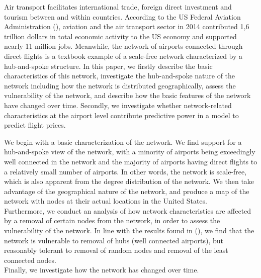\label{sec:intro}




Air transport facilitates international trade, foreign direct investment and tourism between and within countries. According to the US Federal Aviation Administration (\citet{FAA}), aviation and the air transport sector in 2014 contributed 1,6 trillion dollars in total economic activity to the US economy and supported nearly 11 million jobs. Meanwhile, the network of airports connected through direct flights is a textbook example of a scale-free network characterized by a hub-and-spoke structure. In this paper, we firstly describe the basic characteristics of this network, investigate the hub-and-spoke nature of the network including how the network is distributed geographically, assess the vulnerability of the network, and describe how the basic features of the network have changed over time. Secondly, we investigate whether network-related characteristics at the airport level contribute predictive power in a model to predict flight prices. 

\medskip 

We begin with a basic characterization of the network. We find support for a hub-and-spoke view of the network, with a minority of airports being exceedingly well connected in the network and the majority of airports having direct flights to a relatively small number of airports. In other words, the network is scale-free, which is also apparent from the degree distribution of the network. We then take advantage of the geographical nature of the network, and produce a map of the network with nodes at their actual locations in the United States. \\ Furthermore, we conduct an analysis of how network characteristics are affected by a removal of certain nodes from the network, in order to assess the vulnerability of the network. In line with the results found in (\cite{chi2004structural}), we find that the network is vulnerable to removal of hubs (well connected airports), but reasonably tolerant to removal of random nodes and removal of the least connected nodes. \\ Finally, we investigate how the network has changed over time. 

